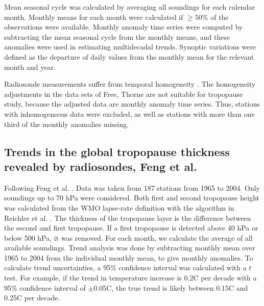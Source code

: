 \documentclass[fleqn,10pt]{wlscirep}
\begin{document}
Mean seasonal cycle was calculated by averaging all soundings for each calendar month. Monthly means for each month were calculated if $\geq 50\%$ of the observations were available. Monthly anomaly time series were computed by subtracting the mean seasonal cycle from the monthly means, and these anomalies were used in estimating multidecadal trends. Synoptic variations were defined as the departure of daily values from the monthly mean for the relevant month and year.

Radiosonde measurements suffer from temporal homogeneity \cite{gaffen1994temporal, parker1995towards, seidel2001climatological, redder2004unexplained, lanzante2003temporal, sherwood2005radiosonde, randel2006biases}. The homogeneity adjustments in the data sets of Free\cite{free2005radiosonde}, Thorne\cite{thorne2005revisiting} are not suitable for tropopause study, because the adjusted data are monthly anomaly time series. Thus, stations with inhomogeneous data were excluded, as well as stations with more than one third of the monthly anomalies missing. 

\subsection*{Trends in the global tropopause thickness revealed by radiosondes, Feng et al. \cite{feng2012trends}}
Following Feng et al. \cite{feng2012trends}. Data was taken from 187 stations from 1965 to 2004. Only soundings up to 70 hPa were considered. Both first and second tropopause height was calculated from the WMO lapse-rate definition with the algorithm in Reichler et al. \cite{reichler2003determining}. The thickness of the tropopause layer is the difference between the second and first tropopause. If a first tropopause is detected above 40 hPa or below 500 hPa, it was removed. For each month, we calculate the average of all available soundings. Trend analysis was done by subtracting monthly mean over 1965 to 2004 from the individual monthly mean, to give monthly anomalies. To calculate trend uncertainties, a 95\% confidence interval was calculated with a $t$ test. For example, if the trend in temperature increase is 0.2\textdegree C per decade with a 95\% confidence interval of $\pm$0.05\textdegree C, the true trend is likely between 0.15\textdegree C and 0.25\textdegree C per decade.
\end{document}

